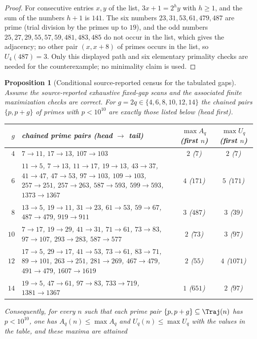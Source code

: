 \documentclass[11pt,a4paper]{article}
\newtheorem{proposition}[theorem]{Proposition}
\theoremstyle{definition}
\theoremstyle{remark}
\numberwithin{equation}{section}
\begin{document}
\begin{proof}
For consecutive entries $x,y$ of the list, $3x+1=2^hy$ with $h\ge1$, and the
sum of the numbers $h+1$ is $141$. The six numbers $23,31,53,61,479,487$ are
prime (trial division by the primes up to $19$), and the odd numbers
$25,27,29,55,57,59,481,483,485$ do not occur in the list, which gives the
adjacency; no other pair $(x,x+8)$ of primes occurs in the list, so
$U_4(487)=3$. Only this displayed path and six elementary primality checks are needed
for the counterexample; no minimality claim is used.
\end{proof}

\begin{proposition}[Conditional source-reported census for the tabulated gaps]\label{B:P:prop:gapcensus}
Assume the source-reported exhaustive fixed-gap scans and the associated
finite maximization checks are correct. For $g=2q\in\{4,6,8,10,12,14\}$ the chained pairs $\{p,p+g\}$ of primes with
$p<10^{10}$ are exactly those listed below (head first).
\begin{center}\small
\begin{tabular}{rp{}cc}
\toprule
$g$ & chained prime pairs (head $\to$ tail) & $\max A_q$ (first $n$) & $\max U_q$ (first $n$)\\\midrule
$4$ & $7\to11$, $17\to13$, $107\to103$ & $2$ ($7$) & $2$ ($7$)\\
$6$ & $11\to5$, $7\to13$, $11\to17$, $19\to13$, $43\to37$, $41\to47$,
$47\to53$, $97\to103$, $109\to103$, $257\to251$, $257\to263$, $587\to593$,
$599\to593$, $1373\to1367$ & $4$ ($171$) & $5$ ($171$)\\
$8$ & $13\to5$, $19\to11$, $31\to23$, $61\to53$, $59\to67$, $487\to479$,
$919\to911$ & $3$ ($487$) & $3$ ($39$)\\
$10$ & $7\to17$, $19\to29$, $41\to31$, $71\to61$, $73\to83$, $97\to107$,
$293\to283$, $587\to577$ & $2$ ($73$) & $3$ ($97$)\\
$12$ & $17\to5$, $29\to17$, $41\to53$, $73\to61$, $83\to71$, $89\to101$,
$263\to251$, $281\to269$, $467\to479$, $491\to479$, $1607\to1619$ & $2$ ($55$) & $4$ ($1071$)\\
$14$ & $19\to5$, $47\to61$, $97\to83$, $733\to719$, $1381\to1367$ & $1$ ($651$) & $2$ ($97$)\\
\bottomrule
\end{tabular}
\end{center}
Consequently, for every $n$ such that each prime pair $\{p,p+g\}\subseteq\Traj(n)$
has $p<10^{10}$, one has $A_q(n)\le\max A_q$ and
$U_q(n)\le\max U_q$ with the values in the table, and these maxima are attained

\end{proposition}
\end{document}
